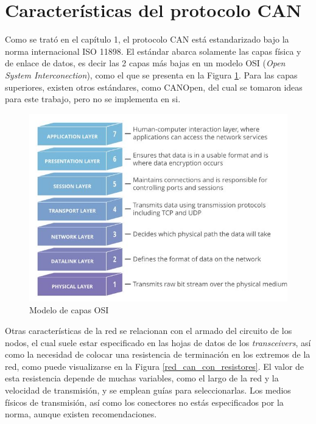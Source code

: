 \section{Características del protocolo CAN}
\label{caracteristicas_can}

Como se trató en el capítulo 1, el protocolo CAN está estandarizado bajo la norma internacional ISO 11898\citep{web_ISO_CAN}. El estándar abarca solamente las capas física y de enlace de datos, es decir las 2 capas más bajas en un modelo OSI (\textit{Open System Interconection}), como el que se presenta en la Figura \ref{fig:modeloOsi}. Para las capas superiores, existen otros estándares, como CANOpen\citep{web_canopen}, del cual se tomaron ideas para este trabajo, pero no se implementa en si.

\begin{figure}[htbp]
	\centering
	\includegraphics[scale=.8]{./Figures/OSI_model.JPG}
	\caption{Modelo de capas OSI\protect\footnotemark}
	\label{fig:modeloOsi}
\end{figure}


Otras características de la red se relacionan con el armado del circuito de los nodos, el cual suele estar especificado en las hojas de datos de los \textit{transceivers}, así como la necesidad de colocar una resistencia de terminación en los extremos de la red, como puede visualizarse en la Figura \ref{red_can_con_resistores}. El valor de esta resistencia depende de muchas variables, como el largo de la red y la velocidad de transmisión, y se emplean guías para seleccionarlas. Los medios físicos de transmisión, así como los conectores no estás especificados por la norma, aunque existen recomendaciones\citep{Embedded_Networking_CAN}.

